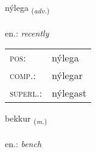 \documentclass[frontgrid, backgrid]{flacards}\usepackage[]{graphicx}\usepackage[]{xcolor}
\begin{document}
\renewcommand{\flhead}{\vskip5pt \fboxsep=0pt {\small\bfseries\footnotesize Atviksorð | Adverb}}
\renewcommand{\fcfoot}{\vskip5pt \fboxsep=0pt \hspace{2pt}{\small\bfseries\footnotesize 2K}}

\renewcommand{\blhead}{\vskip5pt {\small\bfseries\footnotesize Atviksorð | Adverb }}
\renewcommand{\bcfoot}{\vskip5pt \hspace{2pt}{\small\bfseries\footnotesize 2K}}


{nýlega \small{\textsubscript{(\textit{adv.})}} \\[1ex] %
\textphonetic{[niːlɛɣa]} \\
en.: \emph{recently} \\  [2ex]
\renewcommand*{\arraystretch}{0.8}
\begin{tabular}{ll}
\textsc{pos}: & nýlega \\ 
\textsc{comp.}: & nýlegar \\ 
\textsc{superl.}: & nýlegast \\
\end{tabular}
}

\renewcommand{\flhead}{\vskip5pt \fboxsep=0pt {\small\bfseries\footnotesize Nafnorð | Noun}}
\renewcommand{\fcfoot}{\vskip5pt \fboxsep=0pt \hspace{2pt}{\small\bfseries\footnotesize 2K}}

\renewcommand{\blhead}{\vskip5pt {\small\bfseries\footnotesize Nafnorð | Noun }}
\renewcommand{\bcfoot}{\vskip5pt \hspace{2pt}{\small\bfseries\footnotesize 2K}}


{bekkur \small{\textsubscript{(\textit{m.})}} \\[1ex] %
\textphonetic{[pɛhkʏr]} \\
en.: \emph{bench} \\  [2ex]
\renewcommand*{\arraystretch}{0.8}
}
\end{document}
